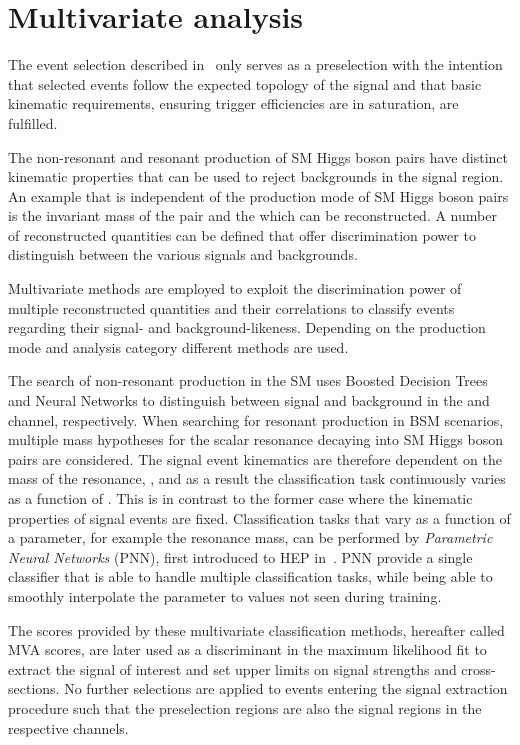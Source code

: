 \section{Multivariate analysis}

The event selection described in~ only
serves as a preselection with the intention that selected events
follow the expected topology of the signal and that basic kinematic
requirements, ensuring trigger efficiencies are in saturation, are
fulfilled.

The non-resonant and resonant production of SM Higgs boson pairs have
distinct kinematic properties that can be used to reject backgrounds
in the signal region. An example that is independent of the production
mode of SM Higgs boson pairs is the invariant mass of the \bbbar pair
and the \hadhad which can be reconstructed. A number of reconstructed
quantities can be defined that offer discrimination power to
distinguish between the various signals and backgrounds.

Multivariate methods are employed to exploit the discrimination power
of multiple reconstructed quantities and their correlations to
classify events regarding their signal- and
background-likeness. Depending on the \HH production mode and analysis
category different methods are used.

The search of non-resonant \HH production in the SM uses Boosted
Decision Trees and Neural Networks to distinguish between signal and
background in the \hadhad and \lephad channel, respectively. When
searching for resonant \HH production in BSM scenarios, multiple mass
hypotheses for the scalar resonance decaying into SM Higgs boson pairs
are considered. The signal event kinematics are therefore dependent on
the mass of the resonance, \mX, and as a result the classification
task continuously varies as a function of \mX. This is in contrast to
the former case where the kinematic properties of signal events are
fixed. Classification tasks that vary as a function of a parameter,
for example the resonance mass, can be performed by \emph{Parametric
  Neural Networks} (PNN), first introduced to HEP
in~\cite{Baldi:2016fzo}. PNN provide a single classifier that is able
to handle multiple classification tasks, while being able to smoothly
interpolate the parameter to values not seen during training.

The scores provided by these multivariate classification methods,
hereafter called MVA scores, are later used as a discriminant in the
maximum likelihood fit to extract the signal of interest and set upper
limits on signal strengths and cross-sections. No further selections
are applied to events entering the signal extraction procedure such
that the preselection regions are also the signal regions in the
respective channels.

